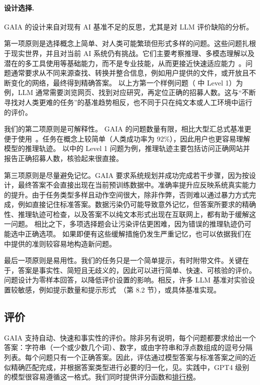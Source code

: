 \documentclass{fairmeta}
\newcommand{\benchmark}{\textsc{GAIA}}
\newcommand{\humanscore}{92\%}
\begin{document}
\paragraph{设计选择.} \benchmark{} 的设计来自对现有 AI 基准不足的反思，尤其是对 LLM 评价缺陷的分析。

第一项原则是选择概念上简单、对人类可能繁琐但形式多样的问题。这些问题扎根于现实世界，并且对当前 AI 系统仍有挑战。它们主要考察推理、多模态理解以及潜在的多工具使用等基础能力，而不是专业技能，从而更接近快速适应能力~\citep{chollet2019measure}。问题通常要求从不同来源查找、转换并整合信息，例如用户提供的文件，或开放且不断变化的网络，最终得到精确答案。
以上方第一个样例问题（ 中 Level 1）为例，LLM 通常需要浏览网页、找到对应研究，再定位正确的招募人数。这与“不断寻找对人类更难的任务”的基准趋势相反，也不同于只在纯文本或人工环境中运行的评价。

我们的第二项原则是可解释性。
\benchmark{} 的问题数量有限，相比大型汇总式基准更便于使用~\citep{perlitz2023efficient}。任务在概念上较简单（人类成功率为 \humanscore{}），因此用户也更容易理解模型的推理轨迹。
以中的 Level 1 问题为例，推理轨迹主要包括访问正确网站并报告正确招募人数，核验起来很直接。

第三项原则是尽量避免记忆。\benchmark{} 要求系统规划并成功完成若干步骤，因为按设计，最终答案不会直接出现在当前预训练数据中。准确率提升应反映系统真实能力的提升。由于任务类型多样且动作空间很大，除非作弊，否则难以通过暴力方式完成，例如直接记住标准答案。数据污染仍可能导致意外记忆，但答案所要求的精确性、推理轨迹可检查，以及答案不以纯文本形式出现在互联网上，都有助于缓解这一问题。
相比之下，多项选择题会让污染评估更困难，因为错误的推理轨迹仍可能选中正确选项。
如果即便有这些缓解措施仍发生严重记忆，也可以依据我们在中提供的准则较容易地构造新问题。

最后一项原则是易用性。我们的任务只是一个简单提示，有时附带文件。关键在于，答案是事实性、简短且无歧义的，因此可以进行简单、快速、可核验的评价。问题设计为零样本回答，以降低评价设置的影响。相反，许多 LLM 基准对实验设置较敏感，例如提示数量和提示形式~\citep{liang2022holistic}（第 8.2 节），或具体基准实现。


\subsection{评价} \benchmark{} 支持自动、快速和事实性的评价。除非另有说明，每个问题都要求给出一个答案：字符串（一个或少数几个词）、数字，或由字符串和浮点数组成的逗号分隔列表。每个问题只有一个正确答案。因此，评估通过模型答案与标准答案之间的近似精确匹配完成，并根据答案类型进行必要的归一化，见。实践中，GPT4 级别的模型很容易遵循这一格式。我们同时提供评分函数和\href{https://huggingface.co/gaia-benchmark}{排行榜}。
\end{document}
